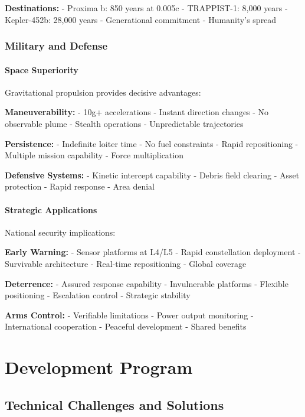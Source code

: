\documentclass[12pt,letterpaper]{book}
\theoremstyle{definition}
\theoremstyle{plain}
\theoremstyle{remark}
\begin{document}
{{{{{\textbf{Destinations:}
- Proxima b: 850 years at 0.005c
- TRAPPIST-1: 8,000 years
- Kepler-452b: 28,000 years
- Generational commitment
- Humanity's spread

\section{Military and Defense}

\subsection{Space Superiority}

Gravitational propulsion provides decisive advantages:

\textbf{Maneuverability:}
- 10g+ accelerations
- Instant direction changes
- No observable plume
- Stealth operations
- Unpredictable trajectories

\textbf{Persistence:}
- Indefinite loiter time
- No fuel constraints
- Rapid repositioning
- Multiple mission capability
- Force multiplication

\textbf{Defensive Systems:}
- Kinetic intercept capability
- Debris field clearing
- Asset protection
- Rapid response
- Area denial

\subsection{Strategic Applications}

National security implications:

\textbf{Early Warning:}
- Sensor platforms at L4/L5
- Rapid constellation deployment
- Survivable architecture
- Real-time repositioning
- Global coverage

\textbf{Deterrence:}
- Assured response capability
- Invulnerable platforms
- Flexible positioning
- Escalation control
- Strategic stability

\textbf{Arms Control:}
- Verifiable limitations
- Power output monitoring
- International cooperation
- Peaceful development
- Shared benefits

\part{Development Program}

\chapter{Technical Challenges and Solutions}

}}}}}
\end{document}
